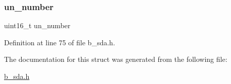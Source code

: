 \subsubsection{\texorpdfstring{un\+\_\+number}{un\_number}}
{\footnotesize\ttfamily uint16\+\_\+t un\+\_\+number}



Definition at line 75 of file b\+\_\+sda.\+h.



The documentation for this struct was generated from the following file\+:\begin{DoxyCompactItemize}
\item 
\mbox{\hyperlink{b__sda_8h}{b\+\_\+sda.\+h}}\end{DoxyCompactItemize}
